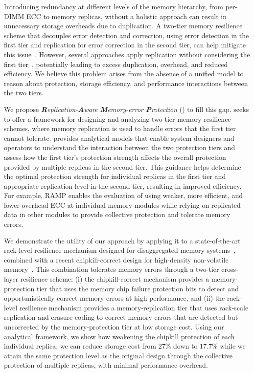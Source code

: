 Introducing redundancy at different levels of the memory hierarchy, from per-DIMM ECC to memory replicas, without a holistic approach can result in unnecessary storage overheads due to duplication. 
A two-tier memory resilience scheme that decouples error detection and correction, using error detection in the first tier and replication for error correction in the second tier, can help mitigate this issue~\cite{patil:dve:isca:2021}. 
However, several approaches apply replication without considering the first tier~\cite{lee:hydra:fast:2022, zhou:carbink:osdi:2022, tsai:dpm:atc:2020, shan:legoos:osdi:2018}, potentially leading to excess duplication, overhead, and reduced efficiency. 
We believe this problem arises from the absence of a unified model to reason about protection, storage efficiency, and performance interactions between the two tiers.

We propose \emph{\textbf{R}eplication-\textbf{A}ware \textbf{M}emory-error \textbf{P}rotection} (\ramp) to fill this gap.
\ramp seeks to offer a framework for designing and analyzing two-tier memory resilience schemes, where memory replication is used to handle errors that the first tier cannot tolerate. 
\ramp provides analytical models that enable system designers and operators to understand the interaction between the two protection tiers and assess how the first tier's protection strength affects the overall protection provided by multiple replicas in the second tier. 
This guidance helps determine the optimal protection strength for individual replicas in the first tier and appropriate replication level in the second tier, resulting in improved efficiency.
For example, RAMP enables the evaluation of using weaker, more efficient, and lower-overhead ECC at individual memory modules while relying on replicated data in other modules to provide collective protection and tolerate memory errors.

We demonstrate the utility of our approach by applying it to a state-of-the-art rack-level resilience mechanism designed for disaggregated memory systems~\cite{lee:hydra:fast:2022}, combined with a recent chipkill-correct design for high-density non-volatile memory~\cite{zhang:pm-chipkill:micro:2018}.
This combination tolerates memory errors through a two-tier cross-layer resilience scheme: 
(i) the chipkill-correct mechanism provides a memory-protection tier that uses the memory chip failure protection bits to detect and opportunistically correct memory errors at high performance, and 
(ii) the rack-level resilience mechanism provides a memory-replication tier that uses rack-scale replication and erasure coding to correct memory errors that are detected but uncorrected by the memory-protection tier at low storage cost. 
Using our analytical framework, we show how weakening the chipkill protection of each individual replica, we can reduce storage cost from $27\%$ down to $17.7\%$ while we attain the same protection level as the original design through the collective protection of multiple replicas, with minimal performance overhead. 

